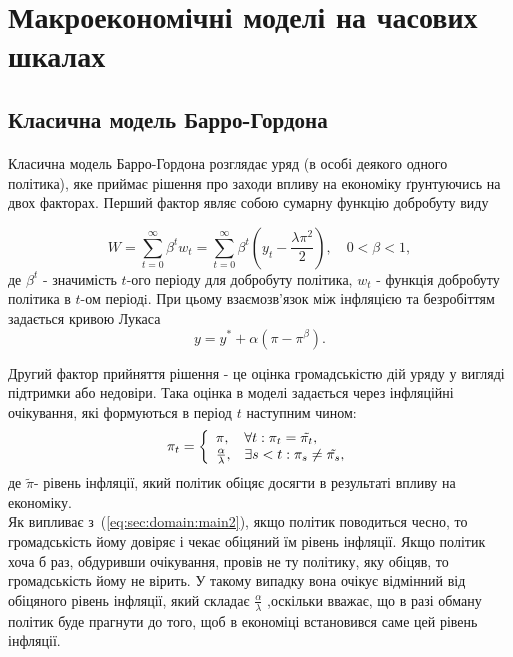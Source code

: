 \section{Макроекономічні моделі на часових шкалах}
\subsection{Класична модель Барро-Гордона}
\label{sec:domain}

\paragraph{} Класична модель Барро-Гордона розглядає уряд (в особі деякого одного політика), яке приймає рішення про заходи впливу на економіку ґрунтуючись на двох факторах. Перший фактор являє собою сумарну функцію добробуту виду

\begin{equation}
 \label{eq:sec:domain:main}
W=\sum_{t=0}^{\infty}\beta^t w_t = \sum_{t=0}^{\infty}\beta^t\left(y_t-\frac{\lambda\pi^2}{2}\right), \quad 0<\beta<1,
\end{equation}
де $\beta^t$ - значимість $t$-ого періоду для добробуту політика, $w_t$ - функція добробуту політика в $t$-ом періодi. При цьому взаємозв'язок між інфляцією та безробіттям задається кривою Лукаса\\
\begin{equation}
	\label{eq:sec:domain:main1}
	y=y^*+\alpha(\pi-\pi^\beta).
\end{equation}

Другий фактор прийняття рішення - це оцінка громадськістю дій уряду у вигляді підтримки або недовіри. Така оцінка в моделі задається через інфляційні очікування, які формуються в період $ t $ наступним чином:
\begin{equation}
\label{eq:sec:domain:main2}
\pi_t = \left\{  \begin{array}{l l}
{\pi}, & \forall t:\pi_t=\tilde{\pi_t}, \\ 
\frac{\alpha}{\lambda}, & \exists s < t : \pi_s \ne \tilde{\pi_s},
\end{array} \right. 
\end{equation}
де $\tilde{\pi}$- рівень інфляції, який політик обіцяє досягти в результаті впливу на економіку.
\\

Як випливає з~(\ref{eq:sec:domain:main2}), якщо політик поводиться чесно, то громадськість йому довіряє і чекає обіцяний їм рівень інфляції. Якщо політик хоча б раз, обдуривши очікування, провів не ту політику, яку обіцяв, то громадськість йому не вірить. У такому випадку вона очікує відмінний від обіцяного рівень інфляції, який складає	 $\frac{\alpha}{\lambda}$ ,оскільки вважає, що в разі обману політик буде прагнути до того, щоб в економіці встановився саме цей рівень інфляції.
\\

